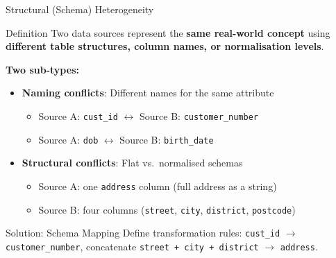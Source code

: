 \documentclass[aspectratio=169,10pt]{beamer}
\begin{document}
\begin{frame}{Structural (Schema) Heterogeneity}
 
      \begin{block}{Definition}
        Two data sources represent the \textbf{same real-world concept} using \textbf{different table structures, column names, or normalisation levels}.
      \end{block}

      \vspace{6pt}
      \textbf{Two sub-types:}
      \begin{itemize}
        \item \textbf{Naming conflicts}: Different names for the same attribute
        \begin{itemize}
          \small
          \item Source A: \texttt{cust\_id} $\leftrightarrow$ Source B: \texttt{customer\_number}
          \item Source A: \texttt{dob} $\leftrightarrow$ Source B: \texttt{birth\_date}
        \end{itemize}
        \item \textbf{Structural conflicts}: Flat vs.\ normalised schemas
        \begin{itemize}
          \small
          \item Source A: one \texttt{address} column (full address as a string)
          \item Source B: four columns (\texttt{street}, \texttt{city}, \texttt{district}, \texttt{postcode})
        \end{itemize}
      \end{itemize}
      
      \vspace{4pt}

      \begin{exampleblock}{Solution: Schema Mapping}
        Define transformation rules: \texttt{cust\_id} $\to$ \texttt{customer\_number}, concatenate \texttt{street + city + district} $\to$ \texttt{address}.
      \end{exampleblock}

     
\end{frame}
\end{document}

